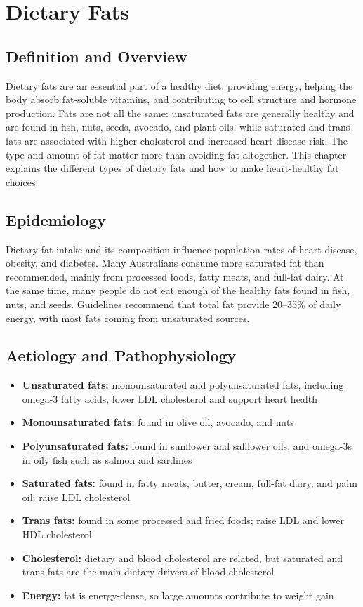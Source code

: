 \chapter{Dietary Fats}

\section*{Definition and Overview}
Dietary fats are an essential part of a healthy diet, providing energy, helping the body absorb fat-soluble vitamins, and contributing to cell structure and hormone production. Fats are not all the same: unsaturated fats are generally healthy and are found in fish, nuts, seeds, avocado, and plant oils, while saturated and trans fats are associated with higher cholesterol and increased heart disease risk. The type and amount of fat matter more than avoiding fat altogether. This chapter explains the different types of dietary fats and how to make heart-healthy fat choices.

\section*{Epidemiology}
Dietary fat intake and its composition influence population rates of heart disease, obesity, and diabetes. Many Australians consume more saturated fat than recommended, mainly from processed foods, fatty meats, and full-fat dairy. At the same time, many people do not eat enough of the healthy fats found in fish, nuts, and seeds. Guidelines recommend that total fat provide 20--35\% of daily energy, with most fats coming from unsaturated sources.

\section*{Aetiology and Pathophysiology}
\begin{itemize}
    \item \textbf{Unsaturated fats:} monounsaturated and polyunsaturated fats, including omega-3 fatty acids, lower LDL cholesterol and support heart health
    \item \textbf{Monounsaturated fats:} found in olive oil, avocado, and nuts
    \item \textbf{Polyunsaturated fats:} found in sunflower and safflower oils, and omega-3s in oily fish such as salmon and sardines
    \item \textbf{Saturated fats:} found in fatty meats, butter, cream, full-fat dairy, and palm oil; raise LDL cholesterol
    \item \textbf{Trans fats:} found in some processed and fried foods; raise LDL and lower HDL cholesterol
    \item \textbf{Cholesterol:} dietary and blood cholesterol are related, but saturated and trans fats are the main dietary drivers of blood cholesterol
    \item \textbf{Energy:} fat is energy-dense, so large amounts contribute to weight gain
\end{itemize}

